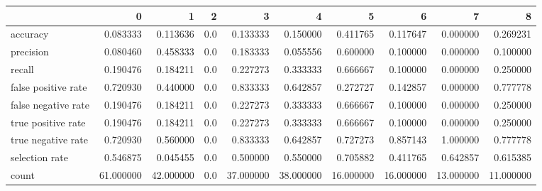 \begin{tabular}{lrrrrrrrrr}
\toprule
{} &          0 &          1 &    2 &          3 &          4 &          5 &          6 &          7 &          8 \\
\midrule
accuracy            &   0.083333 &   0.113636 &  0.0 &   0.133333 &   0.150000 &   0.411765 &   0.117647 &   0.000000 &   0.269231 \\
precision           &   0.080460 &   0.458333 &  0.0 &   0.183333 &   0.055556 &   0.600000 &   0.100000 &   0.000000 &   0.100000 \\
recall              &   0.190476 &   0.184211 &  0.0 &   0.227273 &   0.333333 &   0.666667 &   0.100000 &   0.000000 &   0.250000 \\
false positive rate &   0.720930 &   0.440000 &  0.0 &   0.833333 &   0.642857 &   0.272727 &   0.142857 &   0.000000 &   0.777778 \\
false negative rate &   0.190476 &   0.184211 &  0.0 &   0.227273 &   0.333333 &   0.666667 &   0.100000 &   0.000000 &   0.250000 \\
true positive rate  &   0.190476 &   0.184211 &  0.0 &   0.227273 &   0.333333 &   0.666667 &   0.100000 &   0.000000 &   0.250000 \\
true negative rate  &   0.720930 &   0.560000 &  0.0 &   0.833333 &   0.642857 &   0.727273 &   0.857143 &   1.000000 &   0.777778 \\
selection rate      &   0.546875 &   0.045455 &  0.0 &   0.500000 &   0.550000 &   0.705882 &   0.411765 &   0.642857 &   0.615385 \\
count               &  61.000000 &  42.000000 &  0.0 &  37.000000 &  38.000000 &  16.000000 &  16.000000 &  13.000000 &  11.000000 \\
\bottomrule
\end{tabular}
